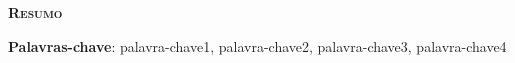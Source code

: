 
\vspace*{45pt}
\begin{flushleft}
	{\Large \textbf{\scshape{Resumo}}}
\end{flushleft}
\vspace*{10pt}


\amostradetexto


\vspace*{20pt}

\noindent \textbf{Palavras-chave}:
palavra-chave1, palavra-chave2, palavra-chave3, palavra-chave4

